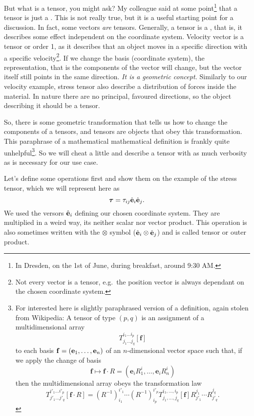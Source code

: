\documentclass[a4paper]{article}
\begin{document}
But what is a tensor, you might ask? My colleague said at some point\footnote{In Dresden, on the 1st of June, during breakfast, around 9:30 AM.} that a tensor
is just a . This is not really true, but it is a useful starting point for a discussion. 
In fact, some vectors 
\emph{are} tensors. Generally, a tensor is a , that is,
it describes some effect independent on the coordinate system. Velocity vector
is a tensor or order 1, as it describes that an object moves in a specific direction 
with a specific velocity\footnote{Not every vector is a tensor, e.g.\ the 
position vector is always dependant on the chosen coordinate system.}. If we
change the basis (coordinate system), the representation, that is the components 
of the vector will change, but the vector itself still points in the same 
direction. \emph{It is a geometric concept.} Similarly to our velocity example, 
stress tensor also describe a distribution of forces inside the material. In 
nature there are no principal, favoured directions, so the object describing it 
should be a tensor.

So, there is some geometric transformation
that tells us how to change the components of a tensors, and tensors 
are objects that obey this transformation. 
This paraphrase of a mathematical mathematical definition is
frankly quite unhelpful\footnote{%
For interested here is slightly paraphrased version of a definition, 
again stolen from Wikipedia: A tensor of type \((p,q)\) is an assignment 
of a multidimensional array
\[
  T^{i_1\dots i_p}_{j_{1}\dots j_{q}}[\mathbf{f}]
\]
to each basis \(\vb{f} = (\vb{e}_1, \dots, \vb{e}_n)\) of an \(n\)-dimensional 
vector space such that, if we apply the change of basis
\[
  \mathbf{f}\mapsto \mathbf{f}\cdot R = \left( \mathbf{e}_i R^i_1, \dots, \mathbf{e}_i R^i_n \right)
\]
then the multidimensional array obeys the transformation law
\[
  T^{i'_1\dots i'_p}_{j'_1\dots j'_q}[\mathbf{f} \cdot R] = \left(R^{-1}\right)^{i'_1}_{i_1} \cdots \left(R^{-1}\right)^{i'_p}_{i_p}
  T^{i_1, \ldots, i_p}_{j_1, \ldots, j_q}[\mathbf{f}]
  R^{j_1}_{j'_1}\cdots R^{j_q}_{j'_q} .
\]
}.
So we will cheat a little 
and describe a tensor with as much verbosity as is necessary for our use case.

Let's define some operations first and show them on the example of the stress 
tensor, which we will represent here as
\[
  \bm{\tau} = \tau_{ij}\hat{\vb{e}}_i \hat{\vb{e}}_j.
\]
We used the versors \(\hat{\vb{e}}_i\) defining our chosen coordinate system. 
They are multiplied in a weird way, its neither scalar nor vector product. This 
operation is also sometimes written with 
the \(\otimes\) symbol (\(\hat{\vb{e}}_i \otimes \hat{\vb{e}}_j\)) and 
is called tensor or outer product.
\end{document}
